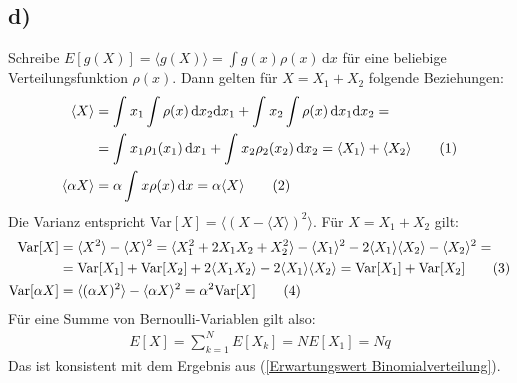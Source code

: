 \documentclass[a4paper,12pt]{article}
\newcommand\numberthis{\addtocounter{equation}{1}\tag{\theequation}}
\newcommand{\bra}{}
\newcommand{\intx}{}
\newcommand{\tecxt}{}
\begin{document}
\subsection*{d)}
Schreibe $E[g(X)]=\bra\langle {g(X)}\rangle=\int g(x)\rho(x)\,\mathrm{d}x$ für eine beliebige Verteilungsfunktion $\rho(x)$. Dann gelten für $X=X_1+X_2$ folgende Beziehungen:
\begin{align*}
\bra\langle {X}\rangle&=\intx\int_{ }^{ }x_1\int \rho(x)\,\mathrm{d}x_2\mathrm{d}x_1+\intx\int_{ }^{ }x_2\int\rho(x)\,\mathrm{d}x_1\mathrm{d}x_2=\\
&=\intx\int_{ }^{ }x_1\rho_1(x_1)\,\mathrm{d}x_1+\intx\int_{ }^{ }x_2\rho_2(x_2)\,\mathrm{d}x_2=\bra\langle {X_1}\rangle+\bra\langle {X_2}\rangle\numberthis\label{Erwartungswert additiv}\\
\bra\langle {\alpha X}\rangle&=\alpha\intx\int_{ }^{ }x\rho(x)\,\mathrm{d}x=\alpha\bra\langle {X}\rangle\numberthis\label{Erwartungswert linear in alpha}
\end{align*}
Die Varianz entspricht Var$[X]=\bra\langle {(X-\bra\langle {X}\rangle)^2}\rangle$. Für $X=X_1+X_2$ gilt:
\begin{align*}
\tecxt\text{Var}[X]&=\bra\langle {X^2}\rangle-\bra\langle {X}\rangle^2=\bra\langle {X_1^2+2X_1X_2+X_2^2}\rangle-\bra\langle {X_1}\rangle^2-2\bra\langle {X_1}\rangle\bra\langle {X_2}\rangle-\bra\langle {X_2}\rangle^2=\\
&=\tecxt\text{Var}[X_1]+\tecxt\text{Var}[X_2]+2\bra\langle {X_1X_2}\rangle-2\bra\langle {X_1}\rangle\bra\langle {X_2}\rangle=\tecxt\text{Var}[X_1]+\tecxt\text{Var}[X_2]\numberthis\label{Varianz additiv}\\
\tecxt\text{Var}[\alpha X]&=\bra\langle {(\alpha X)^2}\rangle-\bra\langle {\alpha X}\rangle^2=\alpha^2\tecxt\text{Var}[X]\numberthis\label{Varianz qudratisch in alpha}
\end{align*}
Für eine Summe von Bernoulli-Variablen gilt also:
\begin{align*}
E[X]=\sum_{k=1}^NE[X_k]=NE[X_1]=Nq
\end{align*}
Das ist konsistent mit dem Ergebnis aus (\ref{Erwartungswert Binomialverteilung}).
\end{document}
